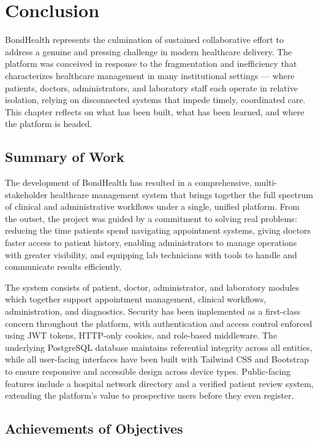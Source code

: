 \chapter{Conclusion}

\noindent BondHealth represents the culmination of sustained collaborative effort to address a genuine and pressing challenge in modern healthcare delivery. The platform was conceived in response to the fragmentation and inefficiency that characterizes healthcare management in many institutional settings --- where patients, doctors, administrators, and laboratory staff each operate in relative isolation, relying on disconnected systems that impede timely, coordinated care. This chapter reflects on what has been built, what has been learned, and where the platform is headed.

\section{Summary of Work}

\noindent The development of BondHealth has resulted in a comprehensive, multi-stakeholder healthcare management system that brings together the full spectrum of clinical and administrative workflows under a single, unified platform. From the outset, the project was guided by a commitment to solving real problems: reducing the time patients spend navigating appointment systems, giving doctors faster access to patient history, enabling administrators to manage operations with greater visibility, and equipping lab technicians with tools to handle and communicate results efficiently.

\noindent The system consists of patient, doctor, administrator, and laboratory modules which together support appointment management, clinical workflows, administration, and diagnostics. Security has been implemented as a first-class concern throughout the platform, with authentication and access control enforced using JWT tokens, HTTP-only cookies, and role-based middleware. The underlying PostgreSQL database maintains referential integrity across all entities, while all user-facing interfaces have been built with Tailwind CSS and Bootstrap to ensure responsive and accessible design across device types. Public-facing features include a hospital network directory and a verified patient review system, extending the platform's value to prospective users before they even register.

\section{Achievements of Objectives}

